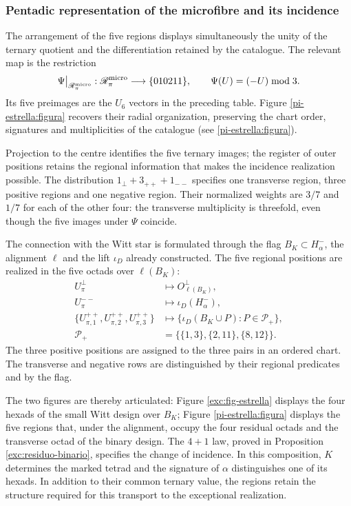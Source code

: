 \subsubsection{Pentadic representation of the microfibre and its incidence}
\label{pi-estrella:desarrollo}

The arrangement of the five regions displays simultaneously
the unity of the ternary quotient and the differentiation retained by the
catalogue. The relevant map is the restriction
\[
 \Psi\big|_{\mathscr R_\pi^{\rm micro}}:
 \mathscr R_\pi^{\rm micro}\longrightarrow\{010211\},
 \qquad \Psi(U)=(-U)\bmod3.
\]
Its five preimages are the \(U_6\) vectors in the preceding table.
Figure \ref{pi-estrella:figura} recovers their radial organization,
preserving the chart order, signatures and multiplicities of the
catalogue (see \ref{pi-estrella:figura}).



Projection to the centre identifies the five ternary images; the
register of outer positions retains the regional information
that makes the incidence realization possible. The distribution
\(1_\perp+3_{++}+1_{--}\) specifies one transverse region, three
positive regions and one negative region. Their normalized weights are
\(3/7\) and \(1/7\) for each of the other four: the
transverse multiplicity is threefold, even though the five images under
\(\Psi\) coincide.

The connection with the Witt star is formulated through the flag
\(B_K\subset H^-_\alpha\), the alignment \(\ell\) and the
lift \(\iota_D\) already constructed. The five regional positions
are realized in the five octads over \(\ell(B_K)\):
\[
\begin{aligned}
 U_\pi^\perp&\longmapsto O^\perp_{\ell(B_K)},\\
 U_\pi^{--}&\longmapsto\iota_D(H^-_\alpha),\\
 \{U_{\pi,1}^{++},U_{\pi,2}^{++},U_{\pi,3}^{++}\}
 &\longmapsto
 \{\iota_D(B_K\cup P):P\in\mathcal P_+\},\\
 \mathcal P_+&=\bigl\{\{1,3\},\{2,11\},\{8,12\}\bigr\}.
\end{aligned}
\]
The three positive positions are assigned to the three pairs
in an ordered chart. The transverse and negative rows
are distinguished by their regional predicates and by the flag.

The two figures are thereby articulated: Figure
\ref{exc:fig-estrella} displays the four hexads of the small Witt
design over \(B_K\); Figure \ref{pi-estrella:figura} displays
the five regions that, under the alignment, occupy the four residual
octads and the transverse octad of the binary design. The
\(4+1\) law, proved in Proposition
\ref{exc:residuo-binario}, specifies the change of incidence. In this
composition, \(K\) determines the marked tetrad and the signature of
\(\alpha\) distinguishes one of its hexads. In addition to their
common ternary value, the regions retain the structure required for this
transport to the exceptional realization.
